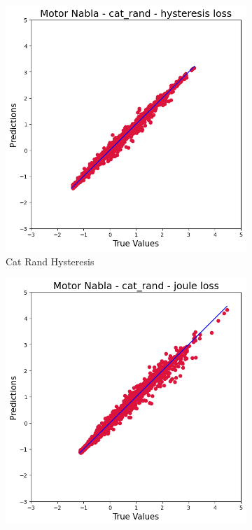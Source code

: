 \documentclass{article}
\begin{document}
\begin{figure}[!htbp]
    \vspace{0.3cm}
    
    \begin{subfigure}[b]{0.23\textwidth}
        \centering
        \null
    \end{subfigure}
    \hfill
    \centering
    \begin{subfigure}[b]{0.23\textwidth}
        \centering
        \includegraphics[width=\textwidth]{images/Nabla/cat_rand_hysteresis.png}
        \caption{Cat Rand Hysteresis}
    \end{subfigure}
    \hfill
    \begin{subfigure}[b]{0.23\textwidth}
        \centering
        \includegraphics[width=\textwidth]{images/Nabla/cat_rand_joule.png}

\end{subfigure}
\end{figure}
\end{document}
